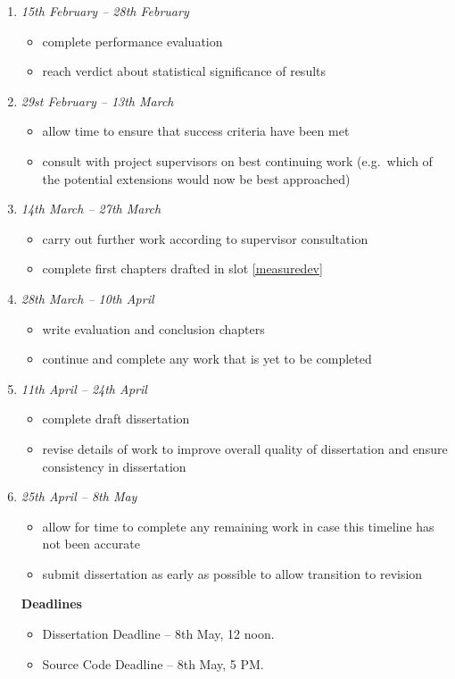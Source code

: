 \documentclass[a4paper,12pt]{article}
\begin{document}
\begin{enumerate}
 \item 
 \emph{15th February -- 28th February}
 \begin{itemize}
	\item complete performance evaluation
	\item reach  verdict about statistical significance of results
 \end{itemize}
 
 \item 
 \emph{29st February -- 13th March}
 \begin{itemize}
	\item allow time to ensure that success criteria have been met
	\item consult with project supervisors on best continuing work (e.g.\ which of the 
	potential extensions would now be best approached)
 \end{itemize}
 
 \item 
 \emph{14th March -- 27th March}
 \begin{itemize}
	\item carry out further work according to supervisor consultation
	\item complete first chapters drafted in slot \ref{measuredev}
 \end{itemize}
 
 \item 
 \emph{28th March -- 10th April}
 \begin{itemize}
	\item write evaluation and conclusion chapters
	\item continue and complete any work that is yet to be completed
 \end{itemize}
 
 \item 
 \emph{11th April -- 24th April}
 \begin{itemize}
	\item complete draft dissertation
	\item revise details of work to improve overall quality of dissertation and ensure 
	consistency in dissertation
 \end{itemize}
 
 \item 
 \emph{25th April -- 8th May}
 \begin{itemize}
	\item allow for time to complete any remaining work in case this timeline has not been 
	accurate
	\item submit dissertation as early as possible to allow transition to revision
 \end{itemize}
 
 \textbf{Deadlines}
 \begin{itemize}
  \item 
  Dissertation Deadline -- 8th May, 12 noon.
  \item
  Source Code Deadline -- 8th May, 5 PM.
 \end{itemize}
\end{enumerate}
\end{document}
